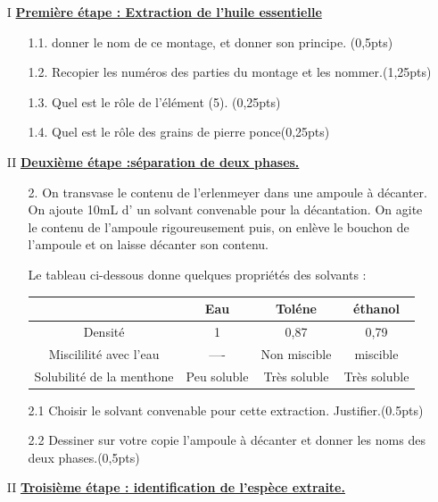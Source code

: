 \documentclass[12pt]{article}
\begin{document}
\begin{enumerate}
	\item[I] \underline{\textbf{Première étape : Extraction de l’huile essentielle}}
		\begin{enumerate}
	\item[1.1.] donner le nom de ce montage, et donner son principe. \dotfill(0,5pts)
	\item [1.2.]Recopier les numéros des parties du montage et les nommer.\dotfill(1,25pts)
	\item [1.3.]Quel est le rôle de l’élément (5). \dotfill(0,25pts)
	\item [1.4.]Quel est le rôle des grains de pierre ponce\dotfill(0,25pts)

		\end{enumerate}
	\item[II] \underline{\textbf{Deuxième étape :séparation de deux phases. }}
		\begin{enumerate}
			\item [2.]On transvase le contenu de l’erlenmeyer dans une ampoule à décanter. On ajoute 10mL d’ un solvant
convenable pour la décantation. On agite le contenu de l’ampoule rigoureusement puis, on enlève le bouchon
de l’ampoule et on laisse décanter son contenu.

Le tableau ci-dessous donne quelques propriétés des solvants :
\begin{center}
\begin{tabular}{ | c | c | c | c | }
	\hline
							& Eau & Toléne & éthanol  \\\hline 
	Densité				    & 1        & 0,87          & 0,79\\\hline  
	Miscililité avec l’eau  &  ---- & Non miscible  & miscible\\\hline  
	Solubilité de la menthone & Peu soluble & Très soluble & Très soluble\\\hline  
\end{tabular}
\end{center}

\item[2.1]Choisir le solvant convenable pour cette extraction. Justifier.\dotfill(0.5pts)
\item[2.2]Dessiner sur votre copie l’ampoule à décanter et donner les noms des deux phases.\dotfill(0,5pts)

		\end{enumerate}
		\vspace{0.5cm}	
	\item[II] \underline{\textbf{Troisième étape : identification de l’espèce extraite.}}


\end{enumerate}
\end{document}
